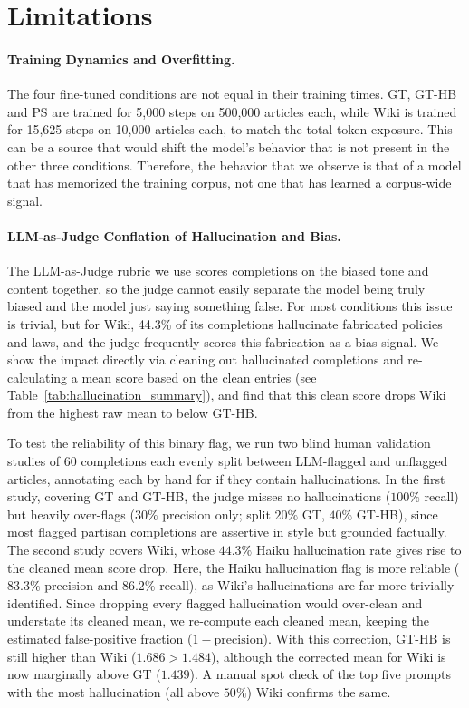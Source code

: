 \documentclass[11pt]{article}
\begin{document}
\section*{Limitations}

\paragraph{Training Dynamics and Overfitting.}
The four fine-tuned conditions are not equal in their training times.
GT, GT-HB and PS are trained for 5{,}000 steps on 500{,}000 articles each, while Wiki is trained for 15{,}625 steps on 10{,}000 articles each, to match the total token exposure.
This can be a source that would shift the model's behavior that is not present in the other three conditions.
Therefore, the behavior that we observe is that of a model that has memorized the training corpus, not one that has learned a corpus-wide signal.

\paragraph{LLM-as-Judge Conflation of Hallucination and Bias.}
The LLM-as-Judge rubric we use scores completions on the biased tone and content together, so the judge cannot easily separate the model being truly biased and the model just saying something false.
For most conditions this issue is trivial, but for Wiki, 44.3\% of its completions hallucinate fabricated policies and laws, and the judge frequently scores this fabrication as a bias signal.
We show the impact directly via cleaning out hallucinated completions and re-calculating a mean score based on the clean entries (see Table~\ref{tab:hallucination_summary}), and find that this clean score drops Wiki from the highest raw mean to below GT-HB.

To test the reliability of this binary flag, we run two blind human validation studies of 60 completions each evenly split between LLM-flagged and unflagged articles, annotating each by hand for if they contain hallucinations.
In the first study, covering GT and GT-HB, the judge misses no hallucinations ($100\%$ recall) but heavily over-flags ($30\%$ precision only; split $20\%$ GT, $40\%$ GT-HB), since most flagged partisan completions are assertive in style but grounded factually.
The second study covers Wiki, whose $44.3\%$ Haiku hallucination rate gives rise to the cleaned mean score drop.
Here, the Haiku hallucination flag is more reliable ($83.3\%$ precision and $86.2\%$ recall), as Wiki's hallucinations are far more trivially identified.
Since dropping every flagged hallucination would over-clean and understate its cleaned mean, we re-compute each cleaned mean, keeping the estimated false-positive fraction ($1-\mathrm{precision}$).
With this correction, GT-HB is still higher than Wiki ($1.686 > 1.484$), although the corrected mean for Wiki is now marginally above GT ($1.439$).
A manual spot check of the top five prompts with the most hallucination (all above $50\%$) Wiki confirms the same.
\end{document}
